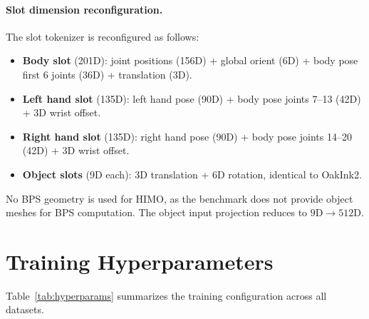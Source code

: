 \documentclass[sigconf, screen, review, anonymous]{acmart}
\begin{document}
\paragraph{Slot dimension reconfiguration.}
The slot tokenizer is reconfigured as follows:
\begin{itemize}
  \item \textbf{Body slot} (201D): joint positions (156D) + global orient (6D) + body pose first 6 joints (36D) + translation (3D).
  \item \textbf{Left hand slot} (135D): left hand pose (90D) + body pose joints 7--13 (42D) + 3D wrist offset.
  \item \textbf{Right hand slot} (135D): right hand pose (90D) + body pose joints 14--20 (42D) + 3D wrist offset.
  \item \textbf{Object slots} (9D each): 3D translation + 6D rotation, identical to OakInk2.
\end{itemize}
No BPS geometry is used for HIMO, as the benchmark does not provide object meshes for BPS computation. The object input projection reduces to $9\text{D} \rightarrow 512\text{D}$.


\section{Training Hyperparameters}
\label{sec:hyperparams}

Table~\ref{tab:hyperparams} summarizes the training configuration across all datasets.
\end{document}
